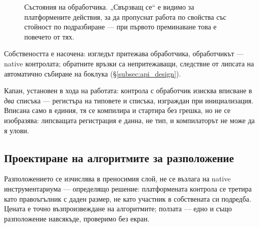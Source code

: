 \begin{figure}[H]
\centering
{}
\caption{Състояния на обработчика. „Свързващ се“ е видимо за платформените действия, за да
пропуснат работа по свойства със стойност по подразбиране --- при първото преминаване
това е повечето от тях.}
\label{fig:handler_lifecycle}
\end{figure}

Собствеността е насочена: изгледът притежава обработчика, обработчикът --- native
контролата; обратните връзки са непритежаващи, следствие от липсата на автоматично
събиране на боклука (§\ref{subsec:api_design}).

Капан, установен в хода на работата: контрола с обработчик изисква вписване в \emph{два}
списъка --- регистъра на типовете и списъка, изграждан при инициализация. Вписана само в
единия, тя се компилира и стартира без грешка, но не се изобразява: липсващата регистрация
е данна, не тип, и компилаторът не може да я улови.

\subsection{Проектиране на алгоритмите за разположение}
\label{subsec:layout_design}

Разположението се изчислява в преносимия слой, не се възлага на native инструментариума
--- определящо решение: платформената контрола се третира като правоъгълник с даден
размер, не като участник в собствената си подредба. Цената е точно възпроизвеждане на
алгоритмите; ползата --- едно и също разположение навсякъде, проверимо без екран.

